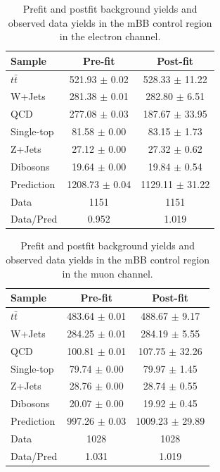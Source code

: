 \begin{table}
\begin{center}
\begin{tabular}{l|c|c} 
Sample        &  Pre-fit &  Post-fit \\ 
\hline 
$t\bar{t}$    &  521.93 $\pm$ 0.02  &  528.33 $\pm$ 11.22   \\ 
W+Jets        &  281.38 $\pm$ 0.01  &  282.80 $\pm$ 6.51    \\ 
QCD           &  277.08 $\pm$ 0.03  &  187.67 $\pm$ 33.95   \\ 
Single-top    &  81.58  $\pm$ 0.00  &  83.15  $\pm$ 1.73    \\ 
Z+Jets        &  27.12  $\pm$ 0.00  &  27.32  $\pm$ 0.62    \\ 
Dibosons      &  19.64  $\pm$ 0.00  &  19.84  $\pm$ 0.54    \\ 
\hline 
Prediction    &  1208.73 $\pm$ 0.04  & 1129.11 $\pm$ 31.22  \\ 
Data          &  1151                & 1151                 \\ 
\hline 
Data/Pred     &  0.952  &   1.019 \\ 
\hline 
\end{tabular} 
\end{center}
\caption{Prefit and postfit background yields and observed data yields in the mBB control region in the electron channel.}
\label{tab:boosted_elec_mbbcr_qcd_fitresults}
\end{table}

\begin{table}
\begin{center}
\begin{tabular}{l|c|c} 
Sample        &  Pre-fit &  Post-fit \\ 
\hline 
$t\bar{t}$    & 483.64 $\pm$ 0.01 &   488.67 $\pm$ 9.17     \\ 
W+Jets        & 284.25 $\pm$ 0.01 &   284.19 $\pm$ 5.55     \\ 
QCD           & 100.81 $\pm$ 0.01 &   107.75 $\pm$ 32.26    \\ 
Single-top    & 79.74  $\pm$ 0.00 &   79.97  $\pm$ 1.45     \\ 
Z+Jets        & 28.76  $\pm$ 0.00 &   28.74  $\pm$ 0.55     \\ 
Dibosons      & 20.07  $\pm$ 0.00 &   19.92  $\pm$ 0.45     \\ 
\hline 
Prediction    & 997.26 $\pm$ 0.03  &  1009.23 $\pm$ 29.89     \\ 
Data          & 1028               &  1028     \\ 
\hline 
Data/Pred     & 1.031 &   1.019   \\ 
\hline 
\end{tabular} 
\end{center}
\caption{Prefit and postfit background yields and observed data yields in the mBB control region in the muon channel.}
\label{tab:boosted_muon_bkgd_mbbcr_qcd_fitresults}
\end{table}

